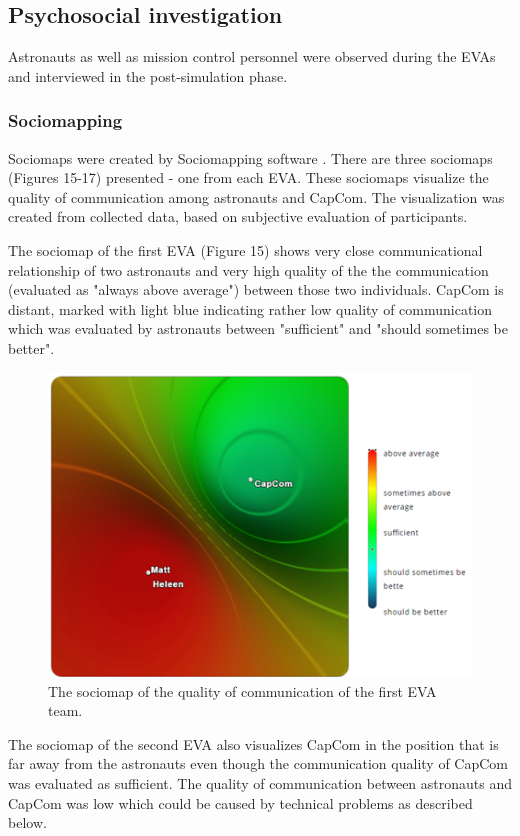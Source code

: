 \documentclass[preprint]{elsarticle}
\begin{document}
\subsection{Psychosocial investigation}
Astronauts as well as mission control personnel were observed during the EVAs and interviewed in the post-simulation phase.

\subsubsection{Sociomapping}
Sociomaps were created by Sociomapping software \cite{ref20}. There are three sociomaps (Figures 15-17) presented - one from each EVA. These sociomaps visualize the quality of communication among astronauts and CapCom. The visualization was created from collected data, based on subjective evaluation of participants.

The sociomap of the first EVA (Figure 15) shows very close communicational relationship of two astronauts and very high quality of the the communication (evaluated as "always above average") between those two individuals. CapCom is distant, marked with light blue indicating rather low quality of communication which was evaluated by astronauts between "sufficient" and "should sometimes be better".

\begin{figure}
\centering
\includegraphics{img/figure15.png}
\caption{The sociomap of the quality of communication of the first EVA team.}
\label{fig:f15}
\end{figure}

The sociomap of the second EVA also visualizes CapCom in the position that is far away from the astronauts even though the communication quality of CapCom was evaluated as sufficient. The quality of communication between astronauts and CapCom was low which could be caused by technical problems as described below.
\end{document}
